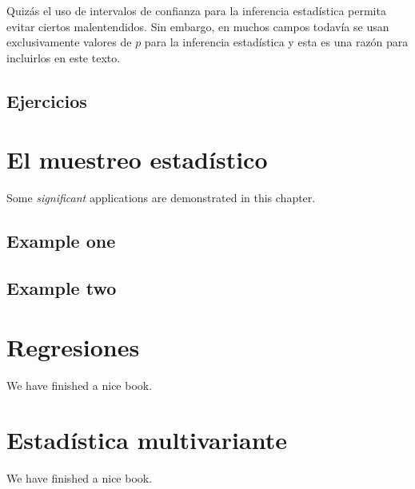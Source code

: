 \documentclass[
]{book}
\begin{document}
Quizás el uso de intervalos de confianza para la inferencia estadística permita evitar ciertos malentendidos. Sin embargo, en muchos campos todavía se usan exclusivamente valores de \(p\) para la inferencia estadística y esta es una razón para incluirlos en este texto.

\hypertarget{ejercicios}{%
\section{Ejercicios}\label{ejercicios}}

\hypertarget{el-muestreo-estaduxedstico}{%
\chapter{El muestreo estadístico}\label{el-muestreo-estaduxedstico}}

Some \emph{significant} applications are demonstrated in this chapter.

\hypertarget{example-one}{%
\section{Example one}\label{example-one}}

\hypertarget{example-two}{%
\section{Example two}\label{example-two}}

\hypertarget{regresiones}{%
\chapter{Regresiones}\label{regresiones}}

We have finished a nice book.

\hypertarget{estaduxedstica-multivariante}{%
\chapter{Estadística multivariante}\label{estaduxedstica-multivariante}}

We have finished a nice book.

  
\end{document}
